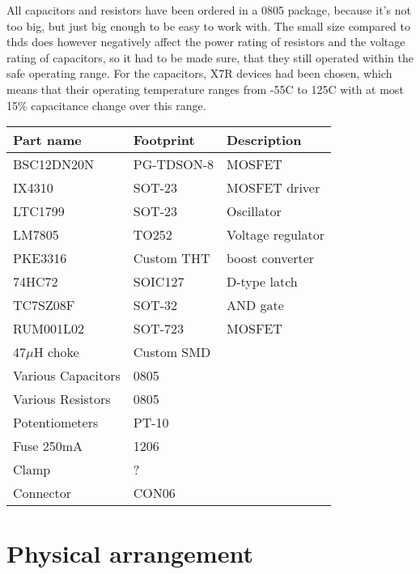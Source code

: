 All capacitors and resistors have been ordered in a 0805 package, because it's not too big, but just big enough to be easy to work with. The small size compared to \glspl{thd} does however negatively affect the power rating of resistors and the voltage rating of capacitors, so it had to be made sure, that they still operated within the safe operating range. For the capacitors, X7R devices had been chosen, which means that their operating temperature ranges from -55\textdegree C to 125\textdegree C with at most 15\% capacitance change over this range\textsuperscript{}.






\begin{tabular}{@{}lll@{}}
    \toprule
    \textbf{Part name} & \textbf{Footprint} & \textbf{Description}\\\midrule
    BSC12DN20N & PG-TDSON-8 & MOSFET\\
    IX4310 & SOT-23 & MOSFET driver\\
    LTC1799 & SOT-23 & Oscillator\\
    LM7805 & TO252 & Voltage regulator\\
    PKE3316 & Custom THT & boost converter\\
    74HC72 & SOIC127 & D-type latch\\
    TC7SZ08F & SOT-32 & AND gate\\
    RUM001L02 & SOT-723 & MOSFET\\
    47\(\mu\)H choke & Custom SMD &\\
    Various Capacitors & 0805 &\\
    Various Resistors & 0805 &\\
    Potentiometers & PT-10&\\
    Fuse 250mA & 1206 &\\
    Clamp & ? &\\
    Connector & CON06 &\\
    \bottomrule
\end{tabular}

\section{Physical arrangement}
\label{sec:physical-arrangement}


